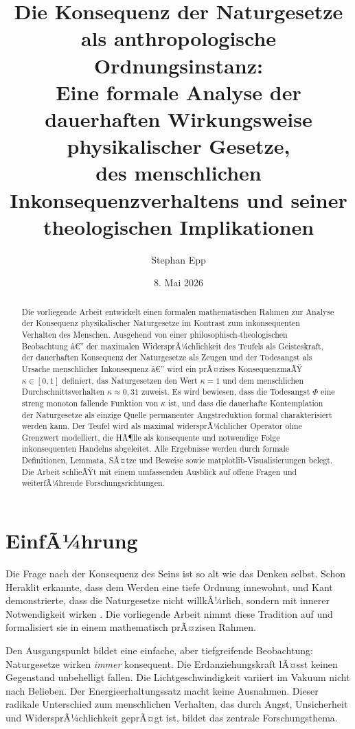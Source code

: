 ﻿\documentclass[a4paper,12pt]{article}
\title{Die Konsequenz der Naturgesetze als anthropologische Ordnungsinstanz:\\
\large Eine formale Analyse der dauerhaften Wirkungsweise physikalischer Gesetze,\\
des menschlichen Inkonsequenzverhaltens und seiner theologischen Implikationen}
\author{Stephan Epp}
\date{8. Mai 2026}
\theoremstyle{definition}
\begin{document}
\maketitle

\begin{abstract}
Die vorliegende Arbeit entwickelt einen formalen mathematischen Rahmen zur Analyse der Konsequenz physikalischer Naturgesetze im Kontrast zum inkonsequenten Verhalten des Menschen. Ausgehend von einer philosophisch-theologischen Beobachtung â€” der maximalen WidersprÃ¼chlichkeit des Teufels als Geisteskraft, der dauerhaften Konsequenz der Naturgesetze als Zeugen und der Todesangst als Ursache menschlicher Inkonsequenz â€” wird ein prÃ¤zises KonsequenzmaÃŸ $\kappa \in [0,1]$ definiert, das Naturgesetzen den Wert $\kappa = 1$ und dem menschlichen Durchschnittsverhalten $\kappa \approx 0{,}31$ zuweist. Es wird bewiesen, dass die Todesangst $\Phi$ eine streng monoton fallende Funktion von $\kappa$ ist, und dass die dauerhafte Kontemplation der Naturgesetze als einzige Quelle permanenter Angstreduktion formal charakterisiert werden kann. Der Teufel wird als maximal widersprÃ¼chlicher Operator ohne Grenzwert modelliert, die HÃ¶lle als konsequente und notwendige Folge inkonsequenten Handelns abgeleitet. Alle Ergebnisse werden durch formale Definitionen, Lemmata, SÃ¤tze und Beweise sowie matplotlib-Visualisierungen belegt. Die Arbeit schlieÃŸt mit einem umfassenden Ausblick auf offene Fragen und weiterfÃ¼hrende Forschungsrichtungen.
\end{abstract}

\tableofcontents
\newpage

\section{EinfÃ¼hrung}

Die Frage nach der Konsequenz des Seins ist so alt wie das Denken selbst. Schon Heraklit erkannte, dass dem Werden eine tiefe Ordnung innewohnt, und Kant demonstrierte, dass die Naturgesetze nicht willkÃ¼rlich, sondern mit innerer Notwendigkeit wirken \cite{kant1781}. Die vorliegende Arbeit nimmt diese Tradition auf und formalisiert sie in einem mathematisch prÃ¤zisen Rahmen.

Den Ausgangspunkt bildet eine einfache, aber tiefgreifende Beobachtung: Naturgesetze wirken \emph{immer} konsequent. Die Erdanziehungskraft lÃ¤sst keinen Gegenstand unbehelligt fallen. Die Lichtgeschwindigkeit variiert im Vakuum nicht nach Belieben. Der Energieerhaltungssatz macht keine Ausnahmen. Dieser radikale Unterschied zum menschlichen Verhalten, das durch Angst, Unsicherheit und WidersprÃ¼chlichkeit geprÃ¤gt ist, bildet das zentrale Forschungsthema.
\end{document}
